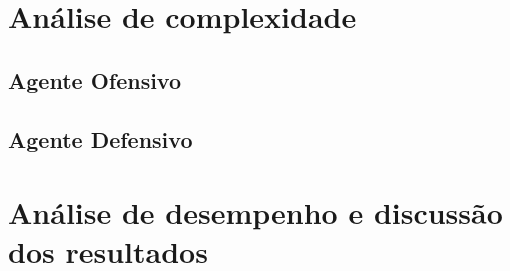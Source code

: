 \documentclass[a4paper,12pt]{article}
\begin{document}
\section{Análise de complexidade}
\subsection{Agente Ofensivo}
\subsection{Agente Defensivo}

\section{Análise de desempenho e discussão dos resultados}
\end{document}
